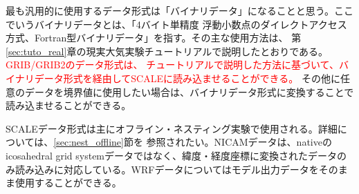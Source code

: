 最も汎用的に使用するデータ形式は「バイナリデータ」になることと思う。ここでいうバイナリデータとは、「4バイト単精度
浮動小数点のダイレクトアクセス方式、Fortran型バイナリデータ」を指す。その主な使用方法は、
第\ref{sec:tuto_real}章の現実大気実験チュートリアルで説明したとおりである。\textcolor{red}{GRIB/GRIB2のデータ形式は、
チュートリアルで説明した方法に基づいて、バイナリデータ形式を経由してSCALEに読み込ませることができる。}
その他に任意のデータを境界値に使用したい場合は、バイナリデータ形式に変換することで読み込ませることができる。

SCALEデータ形式は主にオフライン・ネスティング実験で使用される。詳細については、\ref{sec:nest_offline}節を
参照されたい。NICAMデータは、nativeのicosahedral grid systemデータではなく、緯度・経度座標に変換されたデータの
み読み込みに対応している。WRFデータについてはモデル出力データをそのまま使用することができる。

